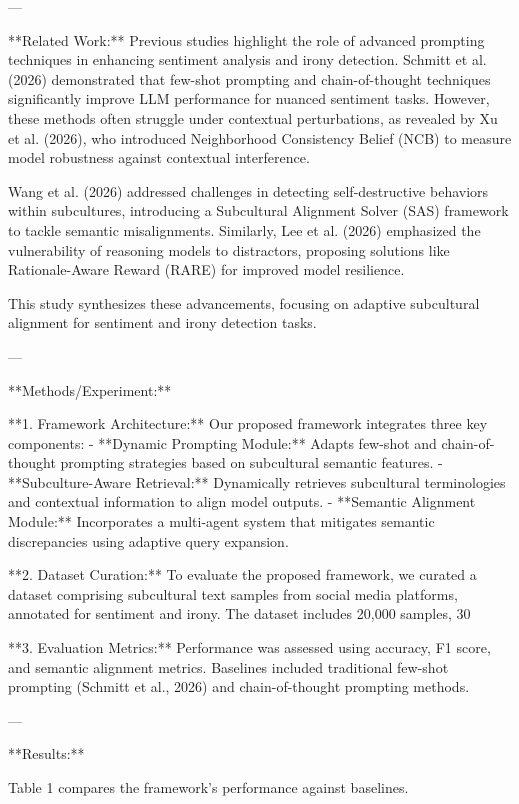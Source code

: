 ---

**Related Work:**  
Previous studies highlight the role of advanced prompting techniques in enhancing sentiment analysis and irony detection. Schmitt et al. (2026) demonstrated that few-shot prompting and chain-of-thought techniques significantly improve LLM performance for nuanced sentiment tasks. However, these methods often struggle under contextual perturbations, as revealed by Xu et al. (2026), who introduced Neighborhood Consistency Belief (NCB) to measure model robustness against contextual interference.  

Wang et al. (2026) addressed challenges in detecting self-destructive behaviors within subcultures, introducing a Subcultural Alignment Solver (SAS) framework to tackle semantic misalignments. Similarly, Lee et al. (2026) emphasized the vulnerability of reasoning models to distractors, proposing solutions like Rationale-Aware Reward (RARE) for improved model resilience.  

This study synthesizes these advancements, focusing on adaptive subcultural alignment for sentiment and irony detection tasks.  

---

**Methods/Experiment:**  

**1. Framework Architecture:**  
Our proposed framework integrates three key components:  
- **Dynamic Prompting Module:** Adapts few-shot and chain-of-thought prompting strategies based on subcultural semantic features.  
- **Subculture-Aware Retrieval:** Dynamically retrieves subcultural terminologies and contextual information to align model outputs.  
- **Semantic Alignment Module:** Incorporates a multi-agent system that mitigates semantic discrepancies using adaptive query expansion.  

**2. Dataset Curation:**  
To evaluate the proposed framework, we curated a dataset comprising subcultural text samples from social media platforms, annotated for sentiment and irony. The dataset includes 20,000 samples, 30%

**3. Evaluation Metrics:**  
Performance was assessed using accuracy, F1 score, and semantic alignment metrics. Baselines included traditional few-shot prompting (Schmitt et al., 2026) and chain-of-thought prompting methods.  

---

**Results:**  

Table 1 compares the framework's performance against baselines.  

